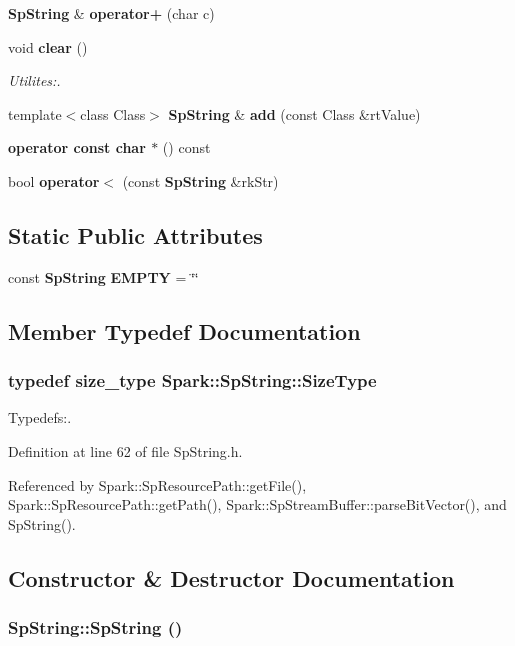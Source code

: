 \begin{CompactItemize}
\item 
{\bf Sp\-String} \& {\bf operator+} (char c)
\item 
void {\bf clear} ()
\begin{CompactList}\small\item\em Utilites:. \item\end{CompactList}\item 
template$<$class Class$>$ {\bf Sp\-String} \& {\bf add} (const Class \&rt\-Value)
\item 
{\bf operator const char $\ast$} () const
\item 
bool {\bf operator$<$} (const {\bf Sp\-String} \&rk\-Str)
\end{CompactItemize}
\subsection*{Static Public Attributes}
\begin{CompactItemize}
\item 
const {\bf Sp\-String} {\bf EMPTY} = \char`\"{}\char`\"{}
\end{CompactItemize}


\subsection{Member Typedef Documentation}
\subsubsection{\setlength{\rightskip}{0pt plus 5cm}typedef size\_\-type {\bf Spark::Sp\-String::Size\-Type}}\label{classSpark_1_1SpString_w0}


Typedefs:. 

Definition at line 62 of file Sp\-String.h.

Referenced by Spark::Sp\-Resource\-Path::get\-File(), Spark::Sp\-Resource\-Path::get\-Path(), Spark::Sp\-Stream\-Buffer::parse\-Bit\-Vector(), and Sp\-String().

\subsection{Constructor \& Destructor Documentation}
\subsubsection{\setlength{\rightskip}{0pt plus 5cm}Sp\-String::Sp\-String ()}\label{classSpark_1_1SpString_a0}



